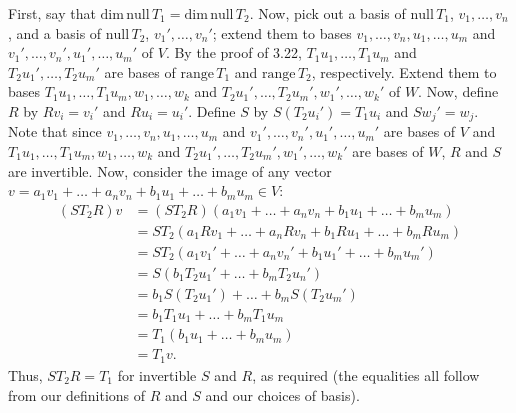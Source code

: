 \documentclass{book}
\begin{document}
\begin{enumerate}
First, say that \(\textrm{dim} \, \textrm{null} \, T_1=\textrm{dim} \, \textrm{null} \, T_2\).  Now, pick out a basis of \(\textrm{null} \, T_1\), \(v_1,\dots,v_n\), and a basis of \(\textrm{null} \, T_2\), \(v_1',\dots,v_n'\); extend them to bases \(v_1,\dots,v_n,u_1,\dots,u_m\) and \(v_1',\dots,v_n',u_1',\dots,u_m'\) of \(V\).  By the proof of 3.22, \(T_1u_1,\dots,T_1u_m\) and \(T_2u_1',\dots,T_2u_m'\) are bases of \(\textrm{range} \, T_1\) and \(\textrm{range} \, T_2\), respectively.  Extend them to bases \(T_1u_1,\dots,T_1u_m,w_1,\dots,w_k\) and \(T_2u_1',\dots,T_2u_m',w_1',\dots,w_k'\) of \(W\).  Now, define \(R\) by \(Rv_i=v_i'\) and \(Ru_i=u_i'\).  Define \(S\) by \(S(T_2u_i')=T_1u_i\) and \(Sw_j'=w_j\).  Note that since \(v_1,\dots,v_n,u_1,\dots,u_m\) and \(v_1',\dots,v_n',u_1',\dots,u_m'\) are bases of \(V\) and \(T_1u_1,\dots,T_1u_m,w_1,\dots,w_k\) and \(T_2u_1',\dots,T_2u_m',w_1',\dots,w_k'\) are bases of \(W\), \(R\) and \(S\) are invertible.  Now, consider the image of any vector \(v=a_1v_1+\dots+a_nv_n+b_1u_1+\dots+b_mu_m \in V\):
\begin{equation*}
\begin{split}
(ST_2R)v &= (ST_2R)(a_1v_1+\dots+a_nv_n+b_1u_1+\dots+b_mu_m) \\
&= ST_2(a_1Rv_1+\dots+a_nRv_n+b_1Ru_1+\dots+b_mRu_m) \\
&= ST_2(a_1v_1'+\dots+a_nv_n'+b_1u_1'+\dots+b_mu_m') \\
&= S(b_1T_2u_1'+\dots+b_mT_2u_n') \\
&= b_1S(T_2u_1')+\dots+b_mS(T_2u_m') \\
&= b_1T_1u_1+\dots+b_mT_1u_m \\
&= T_1(b_1u_1+\dots+b_mu_m) \\
&= T_1v.
\end{split}
\end{equation*}
Thus, \(ST_2R=T_1\) for invertible \(S\) and \(R\), as required (the equalities all follow from our definitions of \(R\) and \(S\) and our choices of basis).


\end{enumerate}
\end{document}

